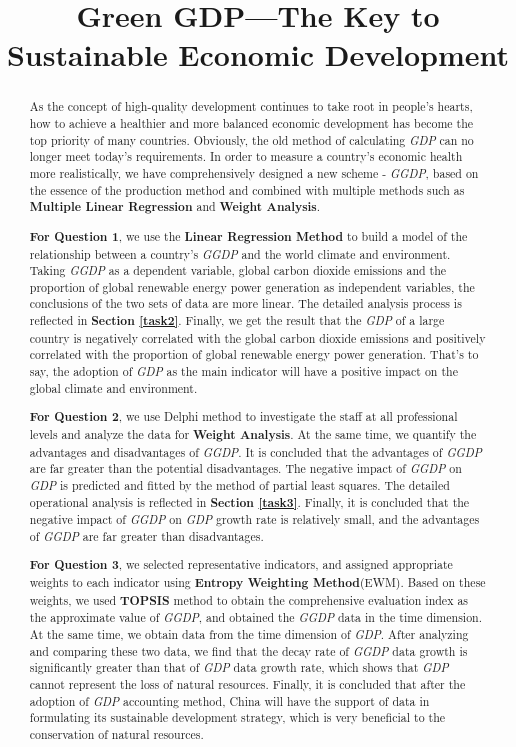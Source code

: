 \documentclass[12pt]{article}
\title{Green GDP—The Key to Sustainable Economic Development}  %
\begin{document}
	\begin{abstract} %
	As the concept of high-quality development continues to take root in people's hearts, how to achieve a healthier and more balanced economic development has become the top priority of many countries.
	Obviously, the old method of calculating \textit{GDP} can no longer meet today's requirements.
	In order to measure a country's economic health more realistically, we have comprehensively designed a new scheme - \textit{GGDP}, based on the essence of the production method and combined with multiple methods such as \textbf{Multiple Linear Regression} and \textbf{Weight Analysis}. 
	
	\textbf{For Question 1}, we use the \textbf{Linear Regression Method} to build a model of the relationship between a country's \textit{GGDP} and the world climate and environment.
	Taking \textit{GGDP} as a dependent variable, global carbon dioxide emissions and the proportion of global renewable energy power generation as independent variables, the conclusions of the two sets of data are more linear.
	The detailed analysis process is reflected in \textbf{Section \ref{task2}}.
	Finally, we get the result that the \textit{GDP} of a large country is negatively correlated with the global carbon dioxide emissions and positively correlated with the proportion of global renewable energy power generation.
	That’s to say, the adoption of \textit{GDP} as the main indicator will have a positive impact on the global climate and environment.
	
	
	\textbf{For Question 2}, we use Delphi method to investigate the staff at all professional levels and analyze the data for \textbf{Weight Analysis}.
	At the same time, we quantify the advantages and disadvantages of \textit{GGDP}.
	It is concluded that the advantages of \textit{GGDP} are far greater than the potential disadvantages.
	The negative impact of \textit{GGDP} on \textit{GDP} is predicted and fitted by the method of partial least squares.
	The detailed operational analysis is reflected in \textbf{Section \ref{task3}}.
	Finally, it is concluded that the negative impact of \textit{GGDP} on \textit{GDP} growth rate is relatively small, and the advantages of \textit{GGDP} are far greater than disadvantages.
	
	
	\textbf{For Question 3}, we selected representative indicators, and assigned appropriate weights to each indicator using \textbf{Entropy Weighting Method}(EWM).
	Based on these weights, we used \textbf{TOPSIS} method to obtain the comprehensive evaluation index as the approximate value of \textit{GGDP}, and obtained the \textit{GGDP} data in the time dimension.
	At the same time, we obtain data from the time dimension of \textit{GDP}.
	After analyzing and comparing these two data, we find that the decay rate of \textit{GGDP} data growth is significantly greater than that of \textit{GDP} data growth rate, which shows that \textit{GDP} cannot represent the loss of natural resources.
	Finally, it is concluded that after the adoption of \textit{GDP} accounting method, China will have the support of data in formulating its sustainable development strategy, which is very beneficial to the conservation of natural resources.
	

\end{abstract}
\end{document}
